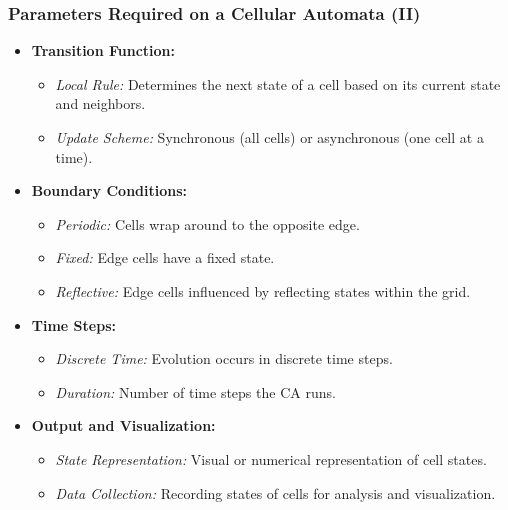 \documentclass{beamer}
\begin{document}
\begin{frame}
    \frametitle{Parameters Required on a Cellular Automata (II)}
    \begin{itemize}
        \item \textbf{Transition Function:}
        \begin{itemize}
            \item \textit{Local Rule:} Determines the next state of a cell based on its current state and neighbors.
            \item \textit{Update Scheme:} Synchronous (all cells) or asynchronous (one cell at a time).
        \end{itemize}
        \item \textbf{Boundary Conditions:}
        \begin{itemize}
            \item \textit{Periodic:} Cells wrap around to the opposite edge.
            \item \textit{Fixed:} Edge cells have a fixed state.
            \item \textit{Reflective:} Edge cells influenced by reflecting states within the grid.
        \end{itemize}
        \item \textbf{Time Steps:}
        \begin{itemize}
            \item \textit{Discrete Time:} Evolution occurs in discrete time steps.
            \item \textit{Duration:} Number of time steps the CA runs.
        \end{itemize}
        \item \textbf{Output and Visualization:}
        \begin{itemize}
            \item \textit{State Representation:} Visual or numerical representation of cell states.
            \item \textit{Data Collection:} Recording states of cells for analysis and visualization.
        \end{itemize}
    \end{itemize}
\end{frame}
\end{document}
